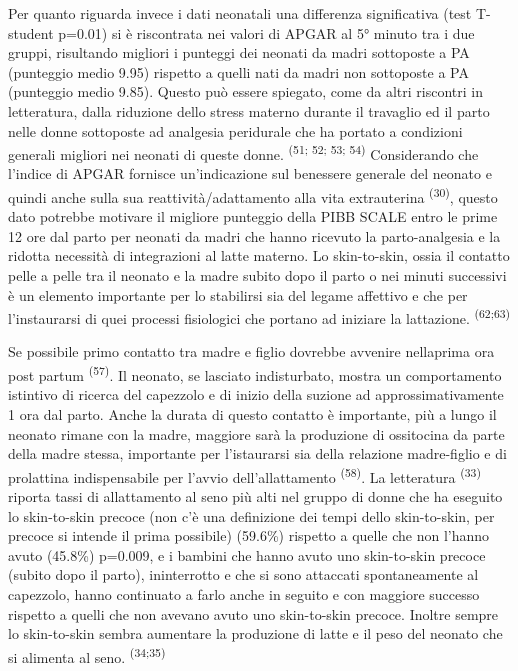 \documentclass[]{article}
\begin{document}
Per quanto riguarda invece i dati neonatali una differenza significativa
(test T-student p=0.01) si è riscontrata nei valori di APGAR al 5°
minuto tra i due gruppi, risultando migliori i punteggi dei neonati da
madri sottoposte a PA (punteggio medio 9.95) rispetto a quelli nati da
madri non sottoposte a PA (punteggio medio 9.85). Questo può essere
spiegato, come da altri riscontri in letteratura, dalla riduzione dello
stress materno durante il travaglio ed il parto nelle donne sottoposte
ad analgesia peridurale che ha portato a condizioni generali migliori
nei neonati di queste donne. \textsuperscript{(51; 52; 53; 54)}
Considerando che l'indice di APGAR fornisce un'indicazione sul benessere
generale del neonato e quindi anche sulla sua reattività/adattamento
alla vita extrauterina \textsuperscript{(30)}, questo dato potrebbe
motivare il migliore punteggio della PIBB SCALE entro le prime 12 ore
dal parto per neonati da madri che hanno ricevuto la parto-analgesia e
la ridotta necessità di integrazioni al latte materno. Lo skin-to-skin,
ossia il contatto pelle a pelle tra il neonato e la madre subito dopo il
parto o nei minuti successivi è un elemento importante per lo stabilirsi
sia del legame affettivo e che per l'instaurarsi di quei processi
fisiologici che portano ad iniziare la lattazione.
\textsuperscript{(62;63)}

Se possibile primo contatto tra madre e figlio dovrebbe avvenire
nellaprima ora post partum \textsuperscript{(57)}. Il neonato, se
lasciato indisturbato, mostra un comportamento istintivo di ricerca del
capezzolo e di inizio della suzione ad approssimativamente 1 ora dal
parto. Anche la durata di questo contatto è importante, più a lungo il
neonato rimane con la madre, maggiore sarà la produzione di ossitocina
da parte della madre stessa, importante per l'istaurarsi sia della
relazione madre-figlio e di prolattina indispensabile per l'avvio
dell'allattamento \textsuperscript{(58)}. La letteratura
\textsuperscript{(33)} riporta tassi di allattamento al seno più alti
nel gruppo di donne che ha eseguito lo skin-to-skin precoce (non c'è una
definizione dei tempi dello skin-to-skin, per precoce si intende il
prima possibile) (59.6\%) rispetto a quelle che non l'hanno avuto
(45.8\%) p=0.009, e i bambini che hanno avuto uno skin-to-skin precoce
(subito dopo il parto), ininterrotto e che si sono attaccati
spontaneamente al capezzolo, hanno continuato a farlo anche in seguito e
con maggiore successo rispetto a quelli che non avevano avuto uno
skin-to-skin precoce. Inoltre sempre lo skin-to-skin sembra aumentare la
produzione di latte e il peso del neonato che si alimenta al seno.
\textsuperscript{(34;35)}
\end{document}
